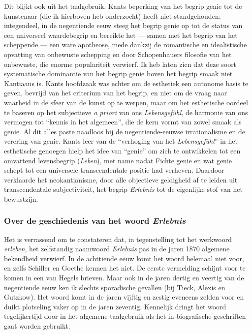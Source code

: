 Dit blijkt ook uit het taalgebruik. Kants beperking van het begrip genie tot de kunstenaar (die ik hierboven heb onderzocht) heeft niet standgehouden; integendeel, in de negentiende eeuw steeg het begrip genie op tot de status van een universeel waardebegrip en bereikte het — samen met het begrip van het scheppende — een ware apotheose, mede dankzij de romantische en idealistische opvatting van onbewuste schepping en door Schopenhauers filosofie van het onbewuste, die enorme populariteit verwierf. Ik heb laten zien dat deze soort systematische dominantie van het begrip genie boven het begrip smaak niet Kantiaans is. Kants hoofdzaak was echter om de esthetiek een autonome basis te geven, bevrijd van het criterium van het begrip, en niet om de vraag naar waarheid in de sfeer van de kunst op te werpen, maar om het esthetische oordeel te baseren op het subjectieve \textit{a priori} van ons \textit{Le\-bensgefühl}, de harmonie van ons vermogen tot ``kennis in het algemeen'', die de kern vormt van zowel smaak als genie. Al dit alles paste naadloos bij de negentiende-eeuwse irrationalisme en de verering van genie. Kants leer van de ``verhoging van het \textit{Lebensgefühl}'' in het esthetische genoegen hielp het idee van ``genie'' om zich te ontwikkelen tot een omvattend levensbegrip (\textit{Leben}), met name nadat Fichte genie en wat genie schept tot een universele transcendentale positie had verheven. Daardoor verklaarde het neokantianisme, door alle objectieve geldigheid af te leiden uit transcendentale subjectiviteit, het begrip \textit{Erlebnis} tot de eigenlijke stof van het bewustzijn.

\subsubsection{Over de geschiedenis van het woord \textit{Erlebnis}}

Het is verrassend om te constateren dat, in tegenstelling tot het werkwoord \textit{erleben}, het zelfstandig naamwoord \textit{Erlebnis} pas in de jaren 1870 algemene bekendheid verwierf. In de achttiende eeuw komt het woord helemaal niet voor, en zelfs Schiller en Goethe kennen het niet. De eerste vermelding schijnt voor te komen in een van Hegels brieven. Maar ook in de jaren dertig en veertig van de negentiende eeuw ken ik slechts sporadische gevallen (bij Tieck, Alexis en Gutzkow). Het woord komt in de jaren vijftig en zestig eveneens zelden voor en duikt plotseling vaker op in de jaren zeventig. Kennelijk dringt het woord tegelijkertijd door in het algemene taalgebruik als het in biografische geschriften gaat worden gebruikt.

